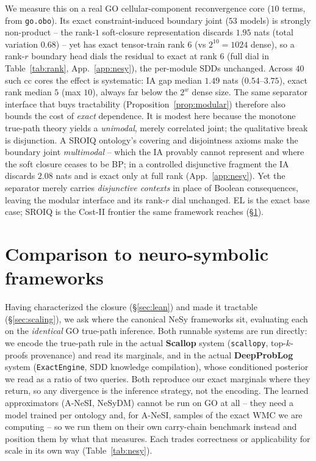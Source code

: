 \documentclass[anon]{nesy2026}
\newcommand{\WMC}{\ensuremath{\mathrm{WMC}}}
\begin{document}
We measure this on a real GO cellular-component reconvergence core ($10$ terms, from \texttt{go.obo}). Its exact constraint-induced boundary joint ($53$ models) is strongly non-product -- the rank-$1$ soft-closure representation discards $1.95$ nats (total variation $0.68$) -- yet has exact tensor-train rank $6$ (vs $2^{10}{=}1024$ dense), so a rank-$r$ boundary head dials the residual to exact at rank $6$ (full dial in Table~\ref{tab:rank}, App.~\ref{app:nesy}), the per-module SDDs unchanged. Across $40$ such cc cores the effect is systematic: IA gap median $1.49$ nats ($0.54$--$3.75$), exact rank median $5$ (max $10$), always far below the $2^{w}$ dense size. The same separator interface that buys tractability (Proposition~\ref{prop:modular}) therefore also bounds the cost of \emph{exact} dependence. It is modest here because the monotone true-path theory yields a \emph{unimodal}, merely correlated joint; the qualitative break is disjunction. A SROIQ ontology's covering and disjointness axioms make the boundary joint \emph{multimodal} -- which the IA provably cannot represent and where the soft closure ceases to be BP; in a controlled disjunctive fragment the IA discards $2.08$ nats and is exact only at full rank (App.~\ref{app:nesy}). Yet the separator merely carries \emph{disjunctive contexts} in place of Boolean consequences, leaving the modular interface and its rank-$r$ dial unchanged. EL is the exact base case; SROIQ is the Cost-II frontier the same framework reaches (\S\ref{sec:nesy}).


\section{Comparison to neuro-symbolic frameworks}\label{sec:nesy}

Having characterized the closure (\S\ref{sec:lean}) and made it tractable (\S\ref{sec:scaling}), we
ask where the canonical NeSy frameworks sit, evaluating each on the \emph{identical} GO true-path
inference. Both runnable systems are run directly: we encode the true-path rule in the actual
\textbf{Scallop} system (\texttt{scallopy}, top-$k$-proofs provenance) and read its marginals, and
in the actual \textbf{DeepProbLog} system (\texttt{ExactEngine}, SDD knowledge compilation), whose
conditioned posterior we read as a ratio of two queries. Both reproduce our exact marginals where
they return, so any divergence is the inference strategy, not the encoding. The learned
approximators (A-NeSI, NeSyDM) cannot be run on GO at all -- they need a model trained per ontology
and, for A-NeSI, samples of the exact $\WMC$ we are computing -- so we run them on their own
carry-chain benchmark instead and position them by what that measures. Each trades
correctness or applicability for scale in its own way (Table~\ref{tab:nesy}).
\end{document}
